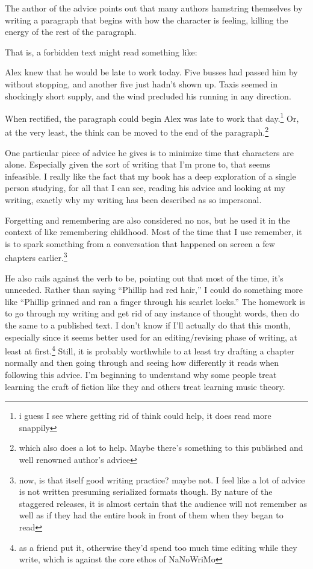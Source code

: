 \documentclass[12pt]{article}[titlepage]
\newcommand{\say}[1]{``#1''}
\newcommand{\1}{\={a}}
\newcommand{\2}{\={e}}
\newcommand{\3}{\={\i}}
\newcommand{\4}{\=o}
\newcommand{\5}{\=u}
\newcommand{\6}{\={A}}
\renewcommand{\,}{\textsuperscript{,}}
\begin{document}
The author of the advice points out that many authors hamstring themselves by writing a paragraph that begins with how the character is feeling, killing the energy of the rest of the paragraph.

That is, a forbidden text might read something like:

Alex knew that he would be late to work today.
Five busses had passed him by without stopping, and another five just hadn't shown up.
Taxis seemed in shockingly short supply, and the wind precluded his running in any direction.

When rectified, the paragraph could begin Alex was late to work that day.\footnote{i guess I see where getting rid of think could help, it does read more snappily}
Or, at the very least, the think can be moved to the end of the paragraph.\footnote{which also does a lot to help.
Maybe there's something to this published and well renowned author's advice}

One particular piece of advice he gives is to minimize time that characters are alone.
Especially given the sort of writing that I'm prone to, that seems infeasible.
I really like the fact that my book has a deep exploration of a single person studying, for all that I can see, reading his advice and looking at my writing, exactly why my writing has been described as so impersonal.

Forgetting and remembering are also considered no nos, but he used it in the context of like remembering childhood.
Most of the time that I use remember, it is to spark something from a conversation that happened on screen a few chapters earlier.\footnote{now, is that itself good writing practice? maybe not.
I feel like a lot of advice is not written presuming serialized formats though.
By nature of the staggered releases, it is almost certain that the audience will not remember as well as if they had the entire book in front of them when they began to read}

He also rails against the verb to be, pointing out that most of the time, it's unneeded.
Rather than saying \say{Phillip had red hair,} I could do something more like \say{Phillip grinned and ran a finger through his scarlet locks.}
The homework is to go through my writing and get rid of any instance of thought words, then do the same to a published text.
I don't know if I'll actually do that this month, especially since it seems better used for an editing/revising phase of writing, at least at first.\footnote{as a friend put it, otherwise they'd spend too much time editing while they write, which is against the core ethos of NaNoWriMo}
Still, it is probably worthwhile to at least try drafting a chapter normally and then going through and seeing how differently it reads when following this advice.
I'm beginning to understand why some people treat learning the craft of fiction like they and others treat learning music theory.
\end{document}
